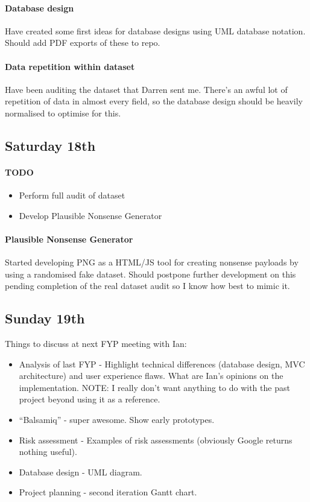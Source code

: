 \paragraph{Database design} Have created some first ideas for database designs
using UML database notation. Should add PDF exports of these to repo.

\paragraph{Data repetition within dataset} Have been auditing the dataset that
Darren sent me. There's an awful lot of repetition of data in almost every
field, so the database design should be heavily normalised to optimise for this.

\subsection{Saturday 18th}

\paragraph{TODO}
\begin{itemize}
\item Perform full audit of dataset
\item Develop Plausible Nonsense Generator
\end{itemize}

\paragraph{Plausible Nonsense Generator} Started developing PNG as a HTML/JS
tool for creating nonsense payloads by using a randomised fake dataset. Should
postpone further development on this pending completion of the real dataset
audit so I know how best to mimic it.

\subsection{Sunday 19th}

\noindent
Things to discuss at next FYP meeting with Ian:
\begin{itemize}
\item Analysis of last FYP - Highlight technical differences (database design,
  MVC architecture) and user experience flaws. What are Ian's opinions on the
  implementation. NOTE: I really don't want anything to do with the past
  project beyond using it as a reference.
\item ``Balsamiq'' - super awesome. Show early prototypes.
\item Risk assessment - Examples of risk assessments (obviously Google returns
  nothing useful).
\item Database design - UML diagram.
\item Project planning - second iteration Gantt chart.
\end{itemize}
